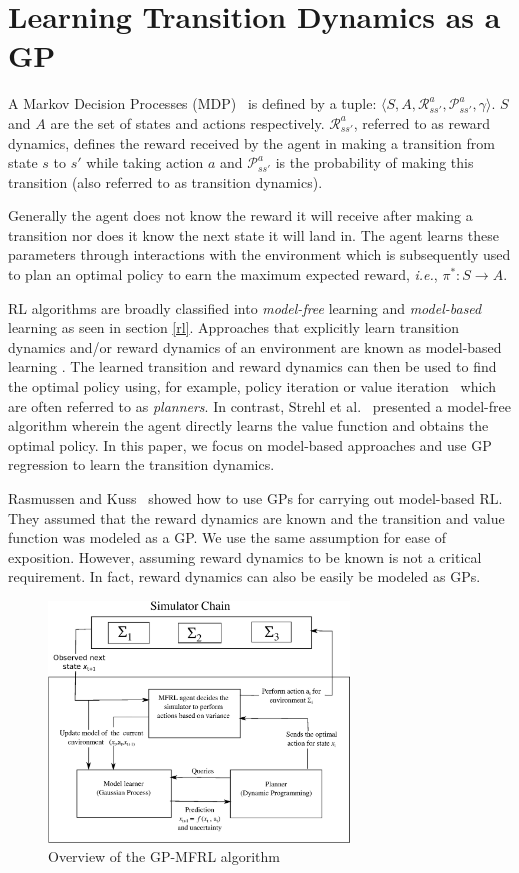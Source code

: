 \documentclass[12pt]{report}
\newcommand{\ie}{\textit{i.e.}}
\begin{document}
\section{Learning Transition Dynamics as a GP}
A Markov Decision Processes (MDP)~\cite{puterman2014markov} is defined by a tuple: $\langle S,A,\mathcal{R}_{ss'}^a,\mathcal{P}_{ss'}^a,\gamma\rangle$. $S$ and $A$ are the set of states and actions respectively. $\mathcal{R}_{ss'}^a$, referred to as reward dynamics, defines the reward received by the agent in making a transition from state $s$ to $s'$ while taking action $a$ and $\mathcal{P}_{ss'}^a$ is the probability of making this transition (also referred to as transition dynamics). 

Generally the agent does not know the reward it will receive after making a transition nor does it know the next state it will land in. The agent learns these parameters through interactions with the environment which is subsequently used to plan an optimal policy to earn the maximum expected reward, \ie, $\pi^{*}:S \rightarrow A$.

RL algorithms are broadly classified into \emph{model-free} learning and \emph{model-based} learning as seen in section \ref{rl}. Approaches that explicitly learn transition dynamics and/or reward dynamics of an environment are known as model-based learning \cite{brafman2002r,kearns2002near}. The learned transition and reward dynamics can then be used to find the optimal policy using, for example, policy iteration or value iteration~\cite{sutton1998reinforcement} which are often referred to as \emph{planners}. In contrast, Strehl et al.~\cite{strehl2006pac} presented a model-free algorithm wherein the agent directly learns the value function and obtains the optimal policy. In this paper, we focus on model-based approaches and use GP regression to learn the transition dynamics. 

Rasmussen and Kuss~\cite{rasmussen2003gaussian} showed how to use GPs for carrying out model-based RL. They assumed that the reward dynamics are known and the transition and value function was modeled as a GP. We use the same assumption for ease of exposition. However, assuming reward dynamics to be known is not a critical requirement. In fact, reward dynamics can also be easily be modeled as GPs.

\begin{figure}[htp]
	\centering
	\includegraphics[width=8cm]{gp-mfrl.eps}
	\caption {Overview of the GP-MFRL algorithm }
   \label{fig:gp_mfrl_system}
\end{figure}
\end{document}
